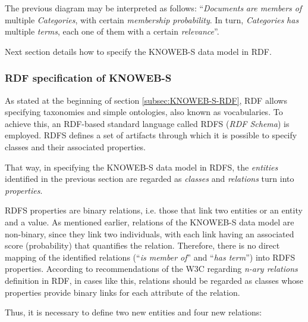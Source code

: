 The previous diagram may be interpreted as follows: \textquotedblleft{}\emph{Documents} \emph{are members of} multiple \emph{Categories}, with certain \emph{membership probability}. In turn, \emph{Categories} \emph{has} multiple \emph{terms}, each one of them with a certain \emph{relevance}\textquotedblright{}. 

Next section details how to specify the KNOWEB-S data model in RDF. 

\subsubsection{RDF specification of KNOWEB-S}
\label{subsub:RDF-spec-of-KNOWEB}

As stated at the beginning of section \ref{subsec:KNOWEB-S-RDF}, RDF allows specifying taxonomies and simple ontologies, also known as vocabularies. To achieve this, an RDF-based standard language called RDFS (\emph{RDF Schema}) \cite{W3C:2004b} is employed. RDFS defines a set of artifacts through which it is possible to specify classes and their associated properties.

That way, in specifying the KNOWEB-S data model in RDFS, the \emph{entities} identified in the previous section are regarded as \emph{classes} and \emph{relations} turn into \emph{properties}. 

RDFS properties are binary relations, i.e. those that link two entities or an entity and a value. As mentioned earlier, relations of the KNOWEB-S data model are non-binary, since they link two individuals, with each link having an associated score (probability) that quantifies the relation. Therefore, there is no direct mapping of the identified relations (\textquotedblleft{}\emph{is member of}\textquotedblright{} and \textquotedblleft{}\emph{has term}\textquotedblright{}) into RDFS properties. According to recommendations of the W3C \cite{W3C:2006} regarding \emph{n-ary relations }definition in RDF, in cases like this, relations should be regarded as classes whose properties provide binary links for each attribute of the relation.

Thus, it is necessary to define two new entities and four new relations:

